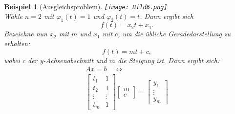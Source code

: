 \documentclass[12pt]{article}
\theoremstyle{break}
\newtheorem{example}[theorem]{Beispiel}
\begin{document}
\begin{example}[Ausgleichsproblem] \leavevmode
\texttt{[image: Bild6.png]}\\
Wähle $n=2$ mit $\varphi_1(t) = 1$ und $\varphi_2(t) = t$. Dann ergibt sich
$$f(t) = x_2t + x_1.$$
Bezeichne nun $x_2$ mit $m$ und $x_1$ mit $c$, um die übliche Geradedarstellung zu erhalten:
$$f(t) = mt + c,$$
wobei $c$ der y-Achsenabschnitt und $m$ die Steigung ist.
Dann ergibt sich:
\begin{align*}
&Ax = b \quad \Leftrightarrow &\\
&\left[ \begin{matrix} t_1 & 1 \\ t_2 & 1 \\ \vdots & \vdots \\ t_m & 1 \end{matrix} \right] \left[ \begin{matrix} m \\ c \end{matrix} \right] = \left[ \begin{matrix} y_1 \\ \vdots \\ y_m \end{matrix} \right]
\end{align*}
\end{example}
\end{document}
